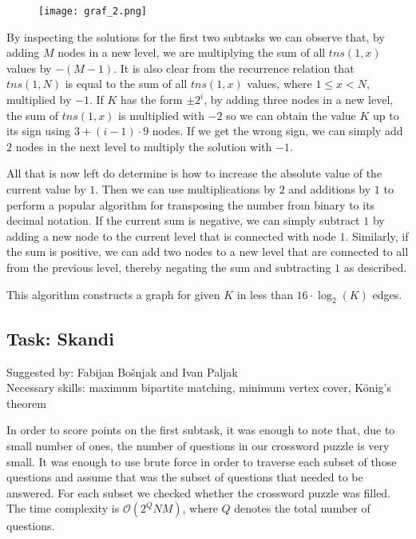 \documentclass[a4paper]{article}
\begin{document}
\begin{figure}[!htbp]
\centering
\texttt{[image: graf\_2.png]}
\end{figure}

By inspecting the solutions for the first two subtasks we can observe that, by
adding $M$ nodes in a new level, we are multiplying the sum of all $tns(1, x)$
values by $-(M - 1)$. It is also clear from the recurrence relation that
$tns(1, N)$ is equal to the sum of all $tns(1, x)$ values, where $1 \le x <N$,
multiplied by $-1$. If $K$ has the form $\pm2^i$, by adding three nodes in a
new level, the sum of $tns(1, x)$ is multiplied with $-2$ so we can obtain the
value $K$ up to its sign using $3 + (i - 1) \cdot 9$ nodes. If we get the wrong
sign, we can simply add $2$ nodes in the next level to multiply the solution
with $-1$.

All that is now left do determine is how to increase the absolute value
of the current value by $1$. Then we can use multiplications by $2$ and
additions by $1$ to perform a popular algorithm for transposing the number
from binary to its decimal notation. If the current sum is negative, we
can simply subtract $1$ by adding a new node to the current level that is
connected with node $1$. Similarly, if the sum is positive, we can add two nodes
to a new level that are connected to all from the previous level, thereby negating
the sum and subtracting $1$ as described.

This algorithm constructs a graph for given $K$ in less than $16 \cdot
\log_2(K)$ edges.

\subsection*{Task: Skandi}
\textsf{Suggested by: Fabijan Bošnjak and Ivan Paljak}\\
\textsf{Necessary skills: maximum bipartite matching, minimum vertex cover,
       K\"{o}nig's theorem}

In order to score points on the first subtask, it was enough to note that,
due to small number of ones, the number of questions in our crossword puzzle
is very small. It was enough to use brute force in order to traverse each
subset of those questions and assume that was the subset of questions that
needed to be answered. For each subset we checked whether the crossword puzzle
was filled. The time complexity is $\mathcal{O}(2^QNM)$, where $Q$ denotes the
total number of questions.
\end{document}
